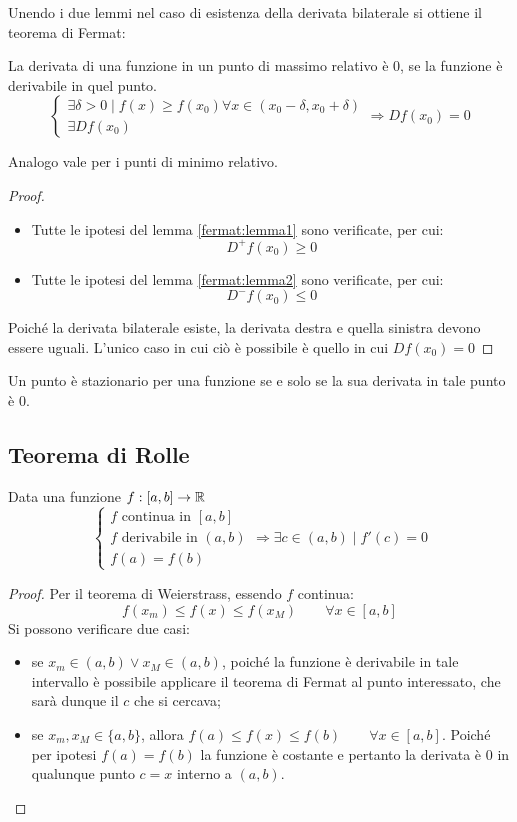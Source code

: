 Unendo i due lemmi nel caso di esistenza della derivata bilaterale si ottiene il teorema di Fermat:
\begin{teor}[di Fermat]
	La derivata di una funzione in un punto di massimo relativo è $0$, se la funzione è derivabile in quel punto.
	\[
		\begin{cases}
			\exists\delta>0\mid f(x)\geq f(x_0)\forall x\in(x_0-\delta,x_0+\delta) \\
			\exists Df(x_0)
		\end{cases}\Rightarrow
		Df(x_0)=0
	\]
\end{teor}
Analogo vale per i punti di minimo relativo.
\begin{proof} ~
	\begin{itemize}
		\item Tutte le ipotesi del lemma \ref{fermat:lemma1} sono verificate, per cui:
		      \[
			      D^+f(x_0)\geq0
		      \]
		\item Tutte le ipotesi del lemma \ref{fermat:lemma2} sono verificate, per cui:
		      \[
			      D^-f(x_0)\leq0
		      \]
	\end{itemize}
	Poiché la derivata bilaterale esiste, la derivata destra e quella sinistra devono essere uguali. L'unico caso in cui ciò è possibile è quello in cui $Df(x_0)=0$
\end{proof}
\begin{defin}
	Un punto è stazionario per una funzione se e solo se la sua derivata in tale punto è $0$.
\end{defin}


\subsection{Teorema di Rolle}
\begin{teor}[di Rolle]
	\label{der:rolle}
	Data una funzione $f:[a,b]\to\mathbb{R}$
	\[
		\begin{cases}
			f\text{ continua in } [a,b]   \\
			f\text{ derivabile in } (a,b) \\
			f(a)=f(b)
		\end{cases}\Rightarrow
		\exists c\in(a,b)\mid f'(c)=0
	\]
\end{teor}
\begin{proof}
	Per il teorema di Weierstrass, essendo $f$ continua:
	\[
		f(x_m)\leq f(x)\leq f(x_M)\qquad\forall x\in[a,b]
	\]
	Si possono verificare due casi:
	\begin{itemize}
		\item se $x_m\in(a,b)\lor x_M\in(a,b)$, poiché la funzione è derivabile in tale intervallo è possibile applicare il teorema di Fermat al punto interessato, che sarà dunque il $c$ che si cercava;
		\item se $x_m,x_M\in\{a,b\}$, allora $f(a)\leq f(x)\leq f(b)\qquad\forall x\in[a,b]$. Poiché per ipotesi $f(a)=f(b)$ la funzione è costante e pertanto la derivata è $0$ in qualunque punto $c=x$ interno a $(a,b)$.
	\end{itemize}
\end{proof}


